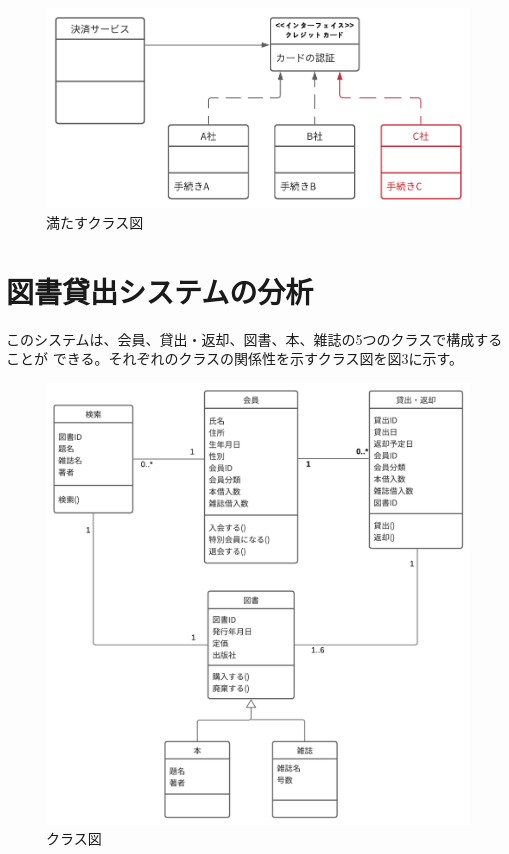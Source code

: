 \documentclass[dvipdfmx,autodetect-engine,titlepage]{jsarticle}
\begin{document}
\begin{figure}[h]
  \centering
  \includegraphics[scale=1]{pic2.png}
  \caption{満たすクラス図}
\end{figure}


\section{図書貸出システムの分析}
このシステムは、会員、貸出・返却、図書、本、雑誌の5つのクラスで構成することが
できる。それぞれのクラスの関係性を示すクラス図を図3に示す。

\begin{figure}[h]
  \centering
  \includegraphics[scale=0.7]{pic3.png}
  \caption{クラス図}
\end{figure}
\end{document}

